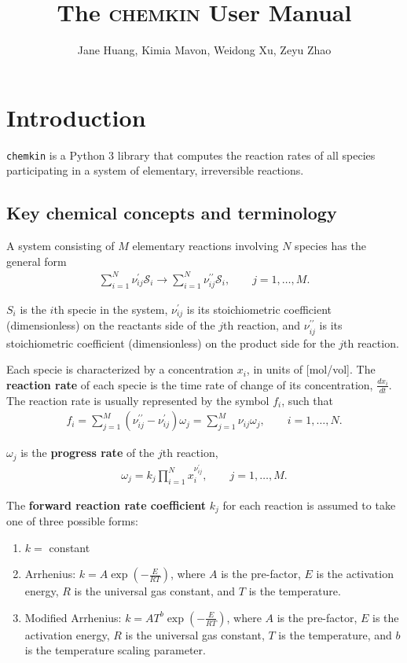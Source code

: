 \documentclass[12pt]{article}
\begin{document}
\title{The \textsc{chemkin} User Manual}
\author{Jane Huang, Kimia Mavon, Weidong Xu, Zeyu Zhao}
\date{}
\maketitle
\section{Introduction}


{\tt chemkin} is a Python 3 library that computes the reaction rates of all species participating in a system of elementary, irreversible reactions. 

\subsection{Key chemical concepts and terminology}

A system consisting of $M$ elementary reactions involving $N$ species has the general form 
\begin{align}
  \sum_{i=1}^{N}{\nu_{ij}^{\prime}\mathcal{S}_{i}} \longrightarrow 
  \sum_{i=1}^{N}{\nu_{ij}^{\prime\prime}\mathcal{S}_{i}}, \qquad j = 1, \ldots, M.
\end{align}

$S_i$ is the $i$th specie in the system, $\nu_{ij}^{\prime}$ is its stoichiometric coefficient (dimensionless) on the reactants side of the $j$th reaction, and $\nu_{ij}^{\prime\prime}$ is its stoichiometric coefficient (dimensionless) on the product side for the $j$th reaction. 

Each specie is characterized by a concentration $x_i$, in units of [mol/vol]. 
The \textbf{reaction rate} of each specie is the time rate of change of its concentration, $\frac{dx_i}{dt}$. The reaction rate is usually represented by the symbol $f_i$, such that 
\begin{align}
  f_{i} = \sum_{j=1}^{M}{(\nu_{ij}^{\prime\prime}-\nu_{ij}^\prime)\omega_{j}}= \sum_{j=1}^{M}{\nu_{ij}\omega_{j}}, \qquad i = 1, \ldots, N.
\end{align}

$\omega_j$ is the \textbf{progress rate} of the $j$th reaction, 
\begin{align}
  \omega_{j} = k_{j}\prod_{i=1}^{N}{x_{i}^{\nu_{ij}^{\prime}}}, \qquad j = 1, \ldots, M. 
  \end{align}

The \textbf{forward reaction rate coefficient} $k_j$ for each reaction is assumed to take one of three possible forms:
\begin{enumerate}
\item $k=$ constant
\item Arrhenius: $k=A\exp(-\frac{E}{RT})$, where $A$ is the pre-factor, $E$ is the activation energy, $R$ is the universal gas constant, and $T$ is the temperature. 
\item Modified Arrhenius: $k=AT^b\exp(-\frac{E}{RT})$, where $A$ is the pre-factor, $E$ is the activation energy, $R$ is the universal gas constant, $T$ is the temperature, and $b$ is the temperature scaling parameter. 
\end{enumerate}
\end{document}
